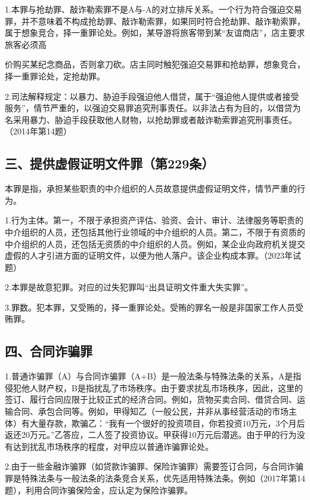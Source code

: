 1.本罪与抢劫罪、敲诈勒索罪不是A与-A的对立排斥关系。一个行为符合强迫交易罪，并不意味着不构成抢劫罪、敲诈勒索罪，如果同时符合抢劫罪、敲诈勒索罪，属于想象竞合，择一重罪论处。例如，某导游将旅客带到某“友谊商店”，店主要求旅客必须高

价购买某纪念商品，否则拿刀砍。店主同时触犯强迫交易罪和抢劫罪，想象竞合，择一重罪论处，定抢劫罪。

2.司法解释规定：以暴力、胁迫手段强迫他人借贷，属于“强迫他人提供或者接受服务”，情节严重的，以强迫交易罪追究刑事责任。以非法占有为目的，以借贷为名采用暴力、胁迫手段获取他人财物，以抢劫罪或者敲诈勒索罪追究刑事责任。（2014年第14题）

\subsection*{三、提供虚假证明文件罪（第229条）}

本罪是指，承担某些职责的中介组织的人员故意提供虚假证明文件，情节严重的行为。

1.行为主体。第一，不限于承担资产评估、验资、会计、审计、法律服务等职责的中介组织的人员，还包括其他行业领域的中介组织的人员。第二，不限于有资质的中介组织的人员，还包括无资质的中介组织的人员。例如，某企业向政府机关提交虚假的人才引进方面的证明文件，以便为他人落户。该企业构成本罪。（2023年试题）

2.本罪是故意犯罪。对应的过失犯罪叫“出具证明文件重大失实罪”。

3.罪数。犯本罪，又受贿的，择一重罪论处。受贿的罪名一般是非国家工作人员受贿罪。

\subsection*{四、合同诈骗罪}

1.普通诈骗罪（A）与合同诈骗罪（A+B）是一般法条与特殊法条的关系，A是指侵犯他人财产权，B是指扰乱了市场秩序。由于要求扰乱市场秩序，因此，这里的签订、履行合同应限于比较正式的经济合同。例如，货物买卖合同、借贷合同、运输合同、承包合同等。例如，甲得知乙（一般公民，并非从事经营活动的市场主体）有大量存款，欺骗乙：“我有一个很好的投资项目，你若投资10万元，3个月后返还20万元。”乙答应，二人签了投资协议。甲获得10万元后潜逃。由于甲的行为没有达到扰乱市场秩序的程度，对甲应以普通诈骗罪论处。

2.由于一些金融诈骗罪（如贷款诈骗罪、保险诈骗罪）需要签订合同，与合同诈骗罪是特殊法条与一般法条的法条竞合关系，优先适用特殊法条。例如（2017年第14题），利用合同诈骗保险金，应认定为保险诈骗罪。

